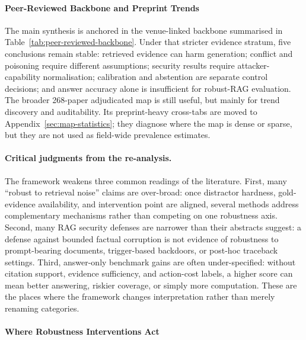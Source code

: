 







\paragraph{Peer-Reviewed Backbone and Preprint Trends}

The main synthesis is anchored in the venue-linked backbone summarised in Table~\ref{tab:peer-reviewed-backbone}. Under that stricter evidence stratum, five conclusions remain stable: retrieved evidence can harm generation; conflict and poisoning require different assumptions; security results require attacker-capability normalisation; calibration and abstention are separate control decisions; and answer accuracy alone is insufficient for robust-RAG evaluation. The broader 268-paper adjudicated map is still useful, but mainly for trend discovery and auditability. Its preprint-heavy cross-tabs are moved to Appendix~\ref{sec:map-statistics}; they diagnose where the map is dense or sparse, but they are not used as field-wide prevalence estimates.

\paragraph{Critical judgments from the re-analysis.}
The framework weakens three common readings of the literature. First, many ``robust to retrieval noise'' claims are over-broad: once distractor hardness, gold-evidence availability, and intervention point are aligned, several methods address complementary mechanisms rather than competing on one robustness axis. Second, many RAG security defenses are narrower than their abstracts suggest: a defense against bounded factual corruption is not evidence of robustness to prompt-bearing documents, trigger-based backdoors, or post-hoc traceback settings. Third, answer-only benchmark gains are often under-specified: without citation support, evidence sufficiency, and action-cost labels, a higher score can mean better answering, riskier coverage, or simply more computation. These are the places where the framework changes interpretation rather than merely renaming categories.

\paragraph{Where Robustness Interventions Act}

